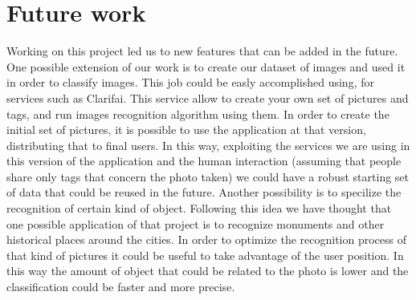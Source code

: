 \section{Future work}
Working on this project led us to new features that can be added in the future.
One possible extension of our work is to create our dataset of images and used it in order to classify images. This job could be easly accomplished using, for services such as Clarifai. This service allow to create your own set of pictures and tags, and run images recognition algorithm using them. In order to create the initial set of pictures, it is possible to use the application at that version, distributing that to final users. In this way, exploiting the services we are using in this version of the application and the human interaction (assuming that people share only tags that concern the photo taken) we could have a robust starting set of data that could be reused in the future. 
Another possibility is to specilize the recognition of certain kind of object. Following this idea we have thought that one possible application of that project is to recognize monuments and other historical places around the cities. In order to optimize the recognition process of that kind of pictures it could be useful to take advantage of the user position. In this way the amount of object that could be related to the photo is lower and the classification could be faster and more precise. 